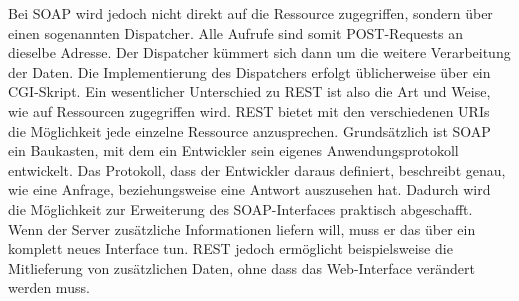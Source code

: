 Bei SOAP wird jedoch nicht direkt auf die Ressource zugegriffen, sondern über einen sogenannten Dispatcher. Alle Aufrufe sind somit POST-Requests an dieselbe Adresse. Der Dispatcher kümmert sich dann um die weitere Verarbeitung der Daten. Die Implementierung des Dispatchers erfolgt üblicherweise über ein CGI-Skript. Ein wesentlicher Unterschied zu REST ist also die Art und Weise, wie auf Ressourcen zugegriffen wird. REST bietet mit den verschiedenen URIs die Möglichkeit jede einzelne Ressource anzusprechen. Grundsätzlich ist SOAP ein Baukasten, mit dem ein Entwickler sein eigenes Anwendungsprotokoll entwickelt. Das Protokoll, dass der Entwickler daraus definiert, beschreibt genau, wie eine Anfrage, beziehungsweise eine Antwort auszusehen hat. Dadurch wird die Möglichkeit zur Erweiterung des SOAP-Interfaces praktisch abgeschafft. Wenn der Server zusätzliche Informationen liefern will, muss er das über ein komplett neues Interface tun. REST jedoch ermöglicht beispielsweise die Mitlieferung von zusätzlichen Daten, ohne dass das Web-Interface verändert werden muss. \cite{RestSoap}